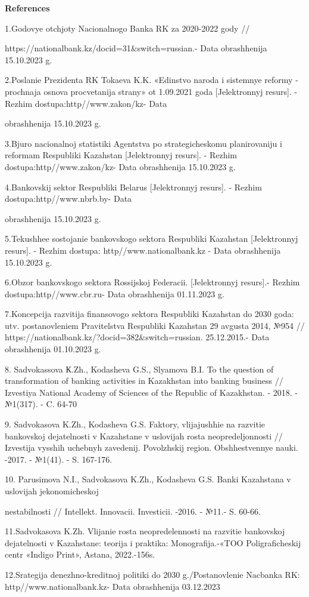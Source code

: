 \begin{center}
{\bfseries References}
\end{center}

\begin{noparindent}
1.Godovye otchjoty Nacional\textquotesingle nogo Banka RK za 2020-2022
gody //

https://nationalbank.kz/docid=31\&switch=russian.- Data
obrashhenija 15.10.2023 g.

2.Poslanie Prezidenta RK Tokaeva K.K. «Edinstvo naroda i sistemnye
reformy - prochnaja osnova procvetanija strany» ot 1.09.2021 goda
{[}Jelektronnyj resurs{]}. - Rezhim dostupa:http//www.zakon/kz- Data

obrashhenija 15.10.2023 g.

3.Bjuro nacional\textquotesingle noj statistiki Agentstva po
strategicheskomu planirovaniju i reformam Respubliki Kazahstan
{[}Jelektronnyj resurs{]}. - Rezhim dostupa:http//www.zakon/kz- Data
obrashhenija 15.10.2023 g.

4.Bankovskij sektor Respubliki Belarus\textquotesingle{} {[}Jelektronnyj
resurs{]}. - Rezhim dostupa:http//www.nbrb.by- Data

obrashhenija
15.10.2023 g.

5.Tekushhee sostojanie bankovskogo sektora Respubliki Kazahstan
{[}Jelektronnyj resurs{]}. - Rezhim dostupa: http//www.nationalbank.kz -
Data obrashhenija 15.10.2023 g.

6.Obzor bankovskogo sektora Rossijskoj Federacii. {[}Jelektronnyj
resurs{]}.- Rezhim dostupa:http//www.cbr.ru- Data obrashhenija
01.11.2023 g.

7.Koncepcija razvitija finansovogo sektora Respubliki Kazahstan do 2030
goda: utv. postanovleniem Pravitel\textquotesingle stva Respubliki
Kazahstan 29 avgusta 2014, №954 //
https://nationalbank.kz/?docid=382\&switch=russian. 25.12.2015.- Data
obrashhenija 01.10.2023 g.

8. Sadvokassova К.Zh., Kodasheva G.S., Slyamova B.I. To the question of
transformation of banking activities in Kazakhstan into banking business
// Izvestiya National Academy of Sciences of the Republic of Kazakhstan.
- 2018. - №1(317). - C. 64-70

9. Sadvokasova K.Zh., Kodasheva G.S. Faktory, vlijajushhie na razvitie
bankovskoj dejatel\textquotesingle nosti v Kazahstane v uslovijah rosta
neopredeljonnosti // Izvestija vysshih uchebnyh zavedenij. Povolzhskij
region. Obshhestvennye nauki. -2017. - №1(41). - S. 167-176.

10. Parusimova N.I., Sadvokasova K.Zh., Kodasheva G.S. Banki Kazahstana
v uslovijah jekonomicheskoj

nestabil\textquotesingle nosti // Intellekt.
Innovacii. Investicii. -2016. - №11.- S. 60-66.

11.Sadvokasova K.Zh. Vlijanie rosta neopredelennosti na razvitie
bankovskoj dejatel\textquotesingle nosti v Kazahstane: teorija i
praktika: Monografija.-«TOO Poligraficheskij centr «Indigo Print»,
Astana, 2022.-156s.

12.Srategija denezhno-kreditnoj politiki do 2030 g./Postanovlenie
Nacbanka RK: http//www.nationalbank.kz- Data obrashhenija 03.12.2023
\end{noparindent}

